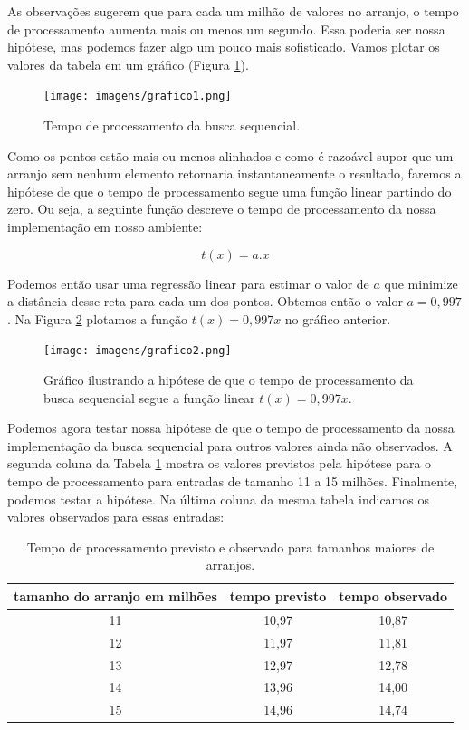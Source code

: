 As observações sugerem que para cada um milhão de valores no arranjo, o tempo de processamento aumenta mais ou menos um segundo.
Essa poderia ser nossa hipótese, mas podemos fazer algo um pouco mais sofisticado.
Vamos plotar os valores da tabela em um gráfico (Figura \ref{fig:observacao}).

\begin{figure}[htp]
  \label{fig:observacao}
  \texttt{[image: imagens/grafico1.png]}
  \caption{Tempo de processamento da busca sequencial.}
\end{figure}

Como os pontos estão mais ou menos alinhados e como é razoável supor que um arranjo sem nenhum elemento retornaria instantaneamente o resultado, faremos a hipótese de que o tempo de processamento segue uma função linear partindo do zero.
Ou seja, a seguinte função descreve o tempo de processamento da nossa implementação em nosso ambiente:

\begin{displaymath}
t(x) = a.x
\end{displaymath}

Podemos então usar uma regressão linear para estimar o valor de $a$ que minimize a distância desse reta para cada um dos pontos.
Obtemos então o valor $a = 0,997$.
Na Figura \ref{fig:hipotese} plotamos a função $t(x) = 0,997x$ no gráfico anterior.

\begin{figure}[htp]
  \label{fig:hipotese}
  \texttt{[image: imagens/grafico2.png]}
  \caption{Gráfico ilustrando a hipótese de que o tempo de processamento da busca sequencial segue a função linear $t(x) = 0,997x$.}
\end{figure}

Podemos agora testar nossa hipótese de que o tempo de processamento da nossa implementação da busca sequencial para outros valores ainda não observados.
A segunda coluna da Tabela \ref{tab:verificacao} mostra os valores previstos pela hipótese para o tempo de processamento para entradas de tamanho 11 a 15 milhões.
Finalmente, podemos testar a hipótese.
Na última coluna da mesma tabela indicamos os valores observados para essas entradas:

\begin{table}
  \label{tab:verificacao}
  \begin{tabular}{|c|c|c|}
    \hline
    tamanho do arranjo em milhões & tempo previsto & tempo observado \\
    \hline 
    11                             & 10,97         & 10,87           \\
    12                             & 11,97         & 11,81           \\
    13                             & 12,97         & 12,78           \\
    14                             & 13,96         & 14,00           \\
    15                             & 14,96         & 14,74           \\
    \hline
  \end{tabular}
  \caption{Tempo de processamento previsto e observado para tamanhos maiores de arranjos.}
\end{table}

